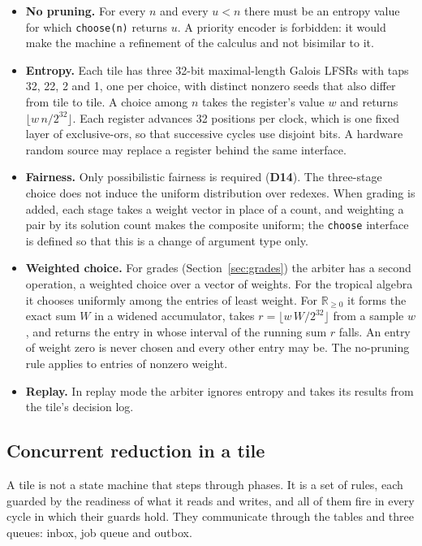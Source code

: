 \documentclass[10.5pt,a4paper]{extarticle}
\newcommand{\kw}[1]{\texttt{#1}}
\newcommand{\dec}[1]{\textbf{D#1}}
\theoremstyle{definition}
\theoremstyle{remark}
\begin{document}
\begin{itemize}
\item \textbf{No pruning.} For every $n$ and every $u<n$ there must be an
entropy value for which \kw{choose(n)} returns $u$. A priority encoder is
forbidden: it would make the machine a refinement of the calculus and not
bisimilar to it.
\item \textbf{Entropy.} Each tile has three 32-bit maximal-length Galois
LFSRs with taps 32, 22, 2 and 1, one per choice, with distinct nonzero seeds
that also differ from tile to tile. A choice among $n$ takes the register's
value $w$ and returns $\lfloor w\,n / 2^{32} \rfloor$. Each register advances
32 positions per clock, which is one fixed layer of exclusive-ors, so that
successive cycles use disjoint bits. A hardware random source may replace a
register behind the same interface.
\item \textbf{Fairness.} Only possibilistic fairness is required (\dec{14}).
The three-stage choice does not induce the uniform distribution over
redexes. When grading is added, each stage takes a weight vector in place of
a count, and weighting a pair by its solution count makes the composite
uniform; the \kw{choose} interface is defined so that this is a change of
argument type only.
\item \textbf{Weighted choice.} For grades (Section~\ref{sec:grades}) the
arbiter has a second operation, a weighted choice over a vector of weights.
For the tropical algebra it chooses uniformly among the entries of least
weight. For $\mathbb{R}_{\ge 0}$ it forms the exact sum $W$ in a widened
accumulator, takes $r = \lfloor w\,W / 2^{32} \rfloor$ from a sample $w$, and
returns the entry in whose interval of the running sum $r$ falls. An entry of
weight zero is never chosen and every other entry may be. The no-pruning rule
applies to entries of nonzero weight.
\item \textbf{Replay.} In replay mode the arbiter ignores entropy and takes
its results from the tile's decision log.
\end{itemize}

\subsection{Concurrent reduction in a tile}\label{sec:step}

A tile is not a state machine that steps through phases. It is a set of
rules, each guarded by the readiness of what it reads and writes, and all of
them fire in every cycle in which their guards hold. They communicate through
the tables and three queues: inbox, job queue and outbox.
\end{document}
